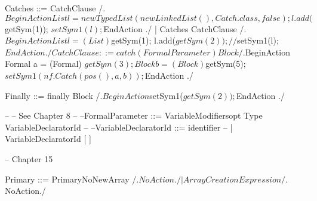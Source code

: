     Catches ::= CatchClause
        /.$BeginAction
                    List l = new TypedList(new LinkedList(), Catch.class, false);
                    l.add($getSym(1));
                    $setSym1(l);
          $EndAction
        ./
              | Catches CatchClause
        /.$BeginAction
                    List l = (List) $getSym(1);
                    l.add($getSym(2));
                    //$setSym1(l);
          $EndAction
        ./
    
    CatchClause ::= catch ( FormalParameter ) Block
        /.$BeginAction
                    Formal a = (Formal) $getSym(3);
                    Block b = (Block) $getSym(5);
                    $setSym1(nf.Catch(pos(), a, b));
          $EndAction
        ./
    
    Finally ::= finally Block
        /.$BeginAction
                    $setSym1($getSym(2));
          $EndAction
        ./
    
    --
    -- See Chapter 8
    --
    --FormalParameter ::= VariableModifiersopt Type VariableDeclaratorId
    --
    --VariableDeclaratorId ::= identifier
    --                       | VariableDeclaratorId [ ]
    
    -- Chapter 15
    
    Primary ::= PrimaryNoNewArray
        /.$NoAction./
              | ArrayCreationExpression
        /.$NoAction./
    
